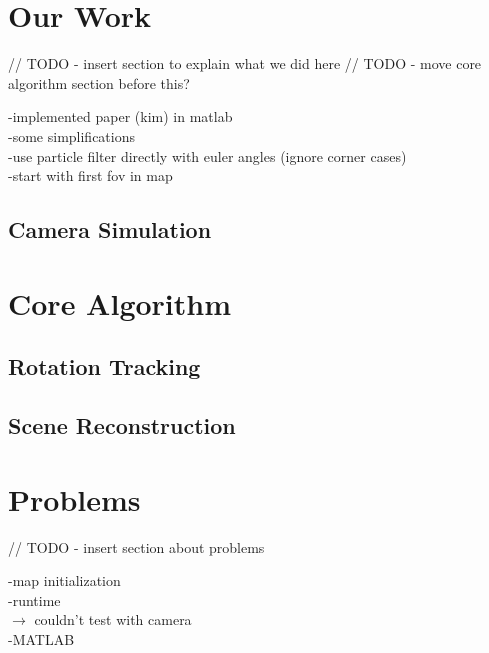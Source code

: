 \documentclass[10pt,twocolumn,letterpaper]{article}
\begin{document}


\section{Our Work}

// TODO - insert section to explain what we did here
// TODO - move core algorithm section before this?

-implemented paper (kim) in matlab\\
-some simplifications\\
    -use particle filter directly with euler angles (ignore corner cases)\\
    -start with first fov in map\\

\subsection{Camera Simulation}





\section{Core Algorithm}



\subsection{Rotation Tracking}



\subsection{Scene Reconstruction}




\section{Problems}

// TODO - insert section about problems

-map initialization\\
-runtime\\
$\rightarrow$ couldn't test with camera\\
-MATLAB\\
\end{document}
